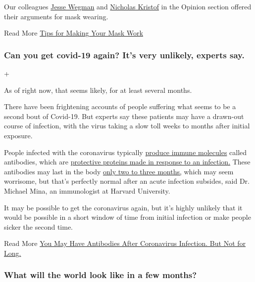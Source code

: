 Our colleagues
\href{https://www.nytimes.com/2020/07/02/opinion/coronavirus-masks.html}{Jesse
Wegman} and
\href{https://www.nytimes.com/2020/07/01/opinion/coronavirus-face-masks.html?action=click\&module=RelatedLinks\&pgtype=Article}{Nicholas
Kristof} in the Opinion section offered their arguments for mask
wearing.

 Read More
\href{https://www.nytimes.com/interactive/2020/06/25/burst/how-to-get-the-most-out-of-your-mask.html}{Tips
for Making Your Mask Work}

\hypertarget{can-you-get-covid-19-again-its-very-unlikely-experts-say}{%
\subsubsection{Can you get covid-19 again? It's very unlikely, experts
say.}\label{can-you-get-covid-19-again-its-very-unlikely-experts-say}}

+

As of right now, that seems likely, for at least several months.

There have been frightening accounts of people suffering what seems to
be a second bout of Covid-19. But experts say these patients may have a
drawn-out course of infection, with the virus taking a slow toll weeks
to months after initial exposure.

People infected with the coronavirus typically
\href{https://www.nature.com/articles/s41586-020-2456-9}{produce immune
molecules} called antibodies, which are
\href{https://www.nytimes.com/2020/05/07/health/coronavirus-antibody-prevalence.html}{protective
proteins made in response to an infection.} These antibodies may last in
the body \href{https://www.nature.com/articles/s41591-020-0965-6}{only
two to three months,} which may seem worrisome, but that's perfectly
normal after an acute infection subsides, said Dr. Michael Mina, an
immunologist at Harvard University.

It may be possible to get the coronavirus again, but it's highly
unlikely that it would be possible in a short window of time from
initial infection or make people sicker the second time.

 Read More
\href{https://www.nytimes.com/2020/07/22/health/covid-antibodies-herd-immunity.html}{You
May Have Antibodies After Coronavirus Infection. But Not for Long.}

\hypertarget{what-will-the-world-look-like-in-a-few-months}{%
\subsubsection{What will the world look like in a few
months?}\label{what-will-the-world-look-like-in-a-few-months}}

